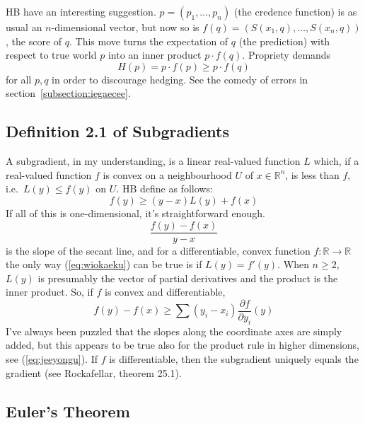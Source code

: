\documentclass[12pt]{article}
\begin{document}
HB have an interesting suggestion. $p=(p_{1},{\ldots},p_{n})$ (the
credence function) is as usual an $n$-dimensional vector, but now so
is $f(q)=(S(x_{1},q),{\ldots},S(x_{n},q))$, the score of $q$. This
move turns the expectation of $q$ (the prediction) with respect to
true world $p$ into an inner product $p\cdot{}f(q)$. Propriety demands
\begin{equation}
  \label{eq:aigureex}
  H(p)=p\cdot{}f(p)\geq{}p\cdot{}f(q)
\end{equation}
for all $p,q$ in order to discourage hedging. See the comedy of errors
in section~\ref{subsection:iegaecee}.

\subsection{Definition 2.1 of Subgradients}
\label{subsection:zaegheef}

A subgradient, in my understanding, is a linear real-valued function $L$ which, if a
real-valued function $f$ is convex on a neighbourhood $U$ of
$x\in\mathbb{R}^{n}$, is less than $f$, i.e.\ $L(y)\leq{}f(y)$ on $U$.
HB define as follows:
\begin{equation}
  \label{eq:wiokaeku}
  f(y)\geq(y-x)L(y)+f(x)
\end{equation}
If all of this is one-dimensional, it's straightforward enough.
\begin{equation}
  \label{eq:hooxajee}
  \frac{f(y)-f(x)}{y-x}
\end{equation}
is the slope of the secant line, and for a differentiable, convex
function $f:\mathbb{R}\rightarrow\mathbb{R}$ the only way
(\ref{eq:wiokaeku}) can be true is if $L(y)=f'(y)$. When $n\geq{}2$,
$L(y)$ is presumably the vector of partial derivatives and the product
is the inner product. So, if $f$ is convex and differentiable,
\begin{equation}
  \label{eq:iiquocah}
  f(y)-f(x)\geq\sum(y_{i}-x_{i})\frac{\partial{}f}{\partial{}y_{i}}(y)
\end{equation}
I've always been puzzled that the slopes along the coordinate axes are
simply added, but this appears to be true also for the product rule in
higher dimensions, see (\ref{eq:jeeyongu}). If $f$ is differentiable,
then the subgradient uniquely equals the gradient (see Rockafellar,
theorem 25.1).

\subsection{Euler's Theorem}
\label{subsection:eephuupe}
\end{document}
